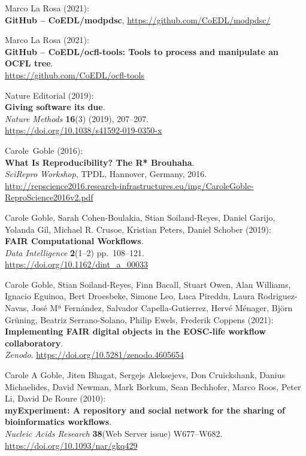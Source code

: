 \begin{thebibliography}{9}
Marco La Rosa (2021):\\
\textbf{GitHub -- CoEDL/modpdsc},
\url{https://github.com/CoEDL/modpdsc/}

Marco La Rosa (2021):\\
\textbf{GitHub -- CoEDL/ocfl-tools: Tools to process and manipulate an OCFL tree}.\\
\url{https://github.com/CoEDL/ocfl-tools}

Nature Editorial (2019):\\
\textbf{Giving software its due}.\\
\emph{Nature Methods} \textbf{16}(3) (2019), 207--207.\\
\url{https://doi.org/10.1038/s41592-019-0350-x}

Carole~Goble (2016):\\
\textbf{What Is Reproducibility? The R* Brouhaha}.\\
\emph{SciRepro Workshop}, TPDL, Hannover, Germany, 2016.
\url{http://repscience2016.research-infrastructures.eu/img/CaroleGoble-ReproScience2016v2.pdf}

Carole Goble, Sarah Cohen-Boulakia, Stian Soiland-Reyes, Daniel
Garijo, Yolanda Gil, Michael R. Crusoe, Kristian Peters, Daniel Schober
(2019):\\
\textbf{FAIR Computational Workflows}.\\
\emph{Data Intelligence} \textbf{2}(1--2) pp.~108--121.\\
\url{https://doi.org/10.1162/dint_a_00033}

Carole Goble, Stian Soiland-Reyes, Finn Bacall, Stuart Owen,
Alan Williams, Ignacio Eguinoa, Bert Droesbeke, Simone Leo, Luca
Pireddu, Laura Rodriguez-Navas, José Mª Fernández, Salvador
Capella-Gutierrez, Hervé Ménager, Björn Grüning, Beatriz Serrano-Solano,
Philip Ewels, Frederik Coppens (2021):\\
\textbf{Implementing FAIR digital objects in the EOSC-life workflow
collaboratory}.\\
\emph{Zenodo}. \url{https://doi.org/10.5281/zenodo.4605654}

Carole A Goble, Jiten Bhagat, Sergejs Aleksejevs, Don
Cruickshank, Danius Michaelides, David Newman, Mark Borkum, Sean
Bechhofer, Marco Roos, Peter Li, David De Roure (2010):\\
\textbf{myExperiment: A repository and social network for the sharing of
bioinformatics workflows}.\\
\emph{Nucleic Acids Research} \textbf{38}(Web Server issue)
W677--W682.\\
\url{https://doi.org/10.1093/nar/gkq429}


\end{thebibliography}
